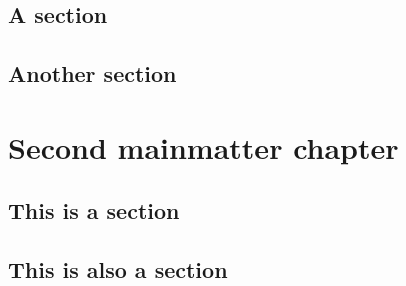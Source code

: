 \documentclass[nocopyright]{uit-thesis-test}
\begin{document}
\lipsum[1]

\section{A section}
\lipsum[3-8]

\section{Another section}
\lipsum[9]

\chapter{Second mainmatter chapter}

\lipsum[1]

\section{This is a section}
\lipsum[3-8]

\section{This is also a section}
\lipsum[9]
\end{document}
